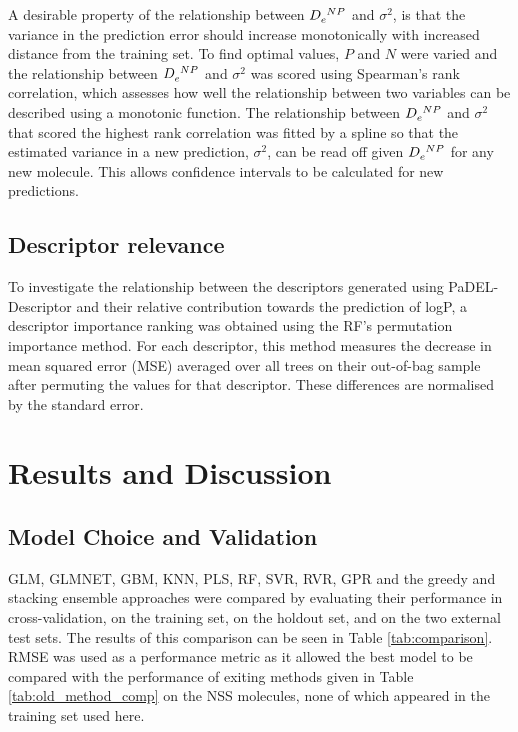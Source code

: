 \documentclass[10pt]{bmc_article}
\newenvironment{bmcformat}{\begin{raggedright}\baselineskip20pt\sloppy\setboolean{publ}{false}}{\end{raggedright}\baselineskip20pt\sloppy}
\begin{document}
\begin{bmcformat}
A desirable property of the relationship between $\tensor{D}{_e^N^P}$ and $\sigma^2$, is that the variance in the prediction error should increase monotonically with increased distance from the training set. To find optimal values, $P$ and $N$ were varied and the relationship between $\tensor{D}{_e^N^P}$ and $\sigma^2$ was scored using Spearman's rank correlation, which assesses how well the relationship between two variables can be described using a monotonic function. The relationship between $\tensor{D}{_e^N^P}$ and $\sigma^2$ that scored the highest rank correlation was fitted by a spline so that the estimated variance in a new prediction, $\sigma^2$, can be read off given $\tensor{D}{_e^N^P}$ for any new molecule. This allows confidence intervals to be calculated for new predictions.

\subsection*{Descriptor relevance}
To investigate the relationship between the descriptors generated using PaDEL-Descriptor and their relative contribution towards the prediction of logP, a descriptor importance ranking was obtained using the RF's permutation importance method. For each descriptor, this method measures the decrease in mean squared error (MSE) averaged over all trees on their out-of-bag sample after permuting the values for that descriptor. These differences are normalised by the standard error.

\newpage

\section*{Results and Discussion} 

\subsection*{Model Choice and Validation}
GLM, GLMNET, GBM, KNN, PLS, RF, SVR, RVR, GPR and the greedy and stacking ensemble approaches were compared by evaluating their performance in cross-validation, on the training set, on the holdout set, and on the two external test sets. The results of this comparison can be seen in Table \ref{tab:comparison}. RMSE was used as a performance metric as it allowed the best model to be compared with the performance of exiting methods given in Table \ref{tab:old_method_comp} on the NSS molecules, none of which appeared in the training set used here. 


\end{bmcformat}
\end{document}
